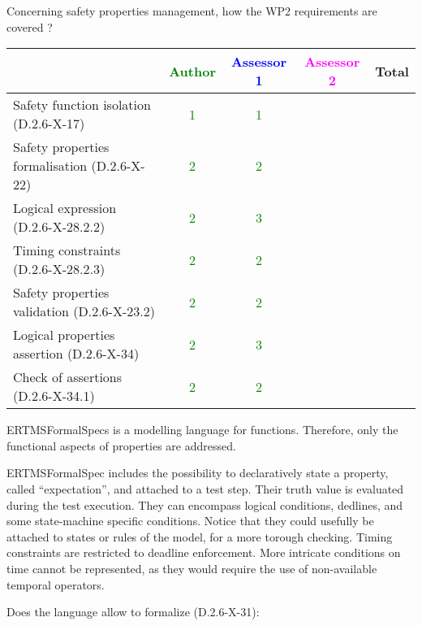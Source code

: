 Concerning safety properties management, how the WP2 requirements are covered ?

\begin{tabular}{|l | c | c | c | c|}
\hline
& \textcolor{green}{Author} & \textcolor{blue}{Assessor 1} & \textcolor{magenta}{Assessor 2} & Total \\
\hline 
Safety function isolation (D.2.6-X-17)  & \textcolor{green}{1} & \textcolor{green}{1} & &  \\
\hline 
Safety properties formalisation (D.2.6-X-22)  & \textcolor{green}{2} & \textcolor{green}{2} & &  \\
\hline
Logical expression (D.2.6-X-28.2.2)  & \textcolor{green}{2} & \textcolor{green}{3} & &  \\
\hline
Timing constraints (D.2.6-X-28.2.3)  & \textcolor{green}{2} & \textcolor{green}{2} & &  \\
\hline
Safety properties validation (D.2.6-X-23.2)  & \textcolor{green}{2} & \textcolor{green}{2} & &  \\
\hline
Logical properties assertion (D.2.6-X-34)  & \textcolor{green}{2} & \textcolor{green}{3} & &  \\
\hline
Check  of assertions (D.2.6-X-34.1)  & \textcolor{green}{2} & \textcolor{green}{2} & &  \\
\hline
\end{tabular}

\begin{author_comment}
ERTMSFormalSpecs is a modelling language for functions. Therefore, only the functional aspects of properties are addressed.  
\end{author_comment}

\begin{assessor1}
ERTMSFormalSpec includes the possibility to declaratively state a property, called "`expectation"', and attached to a test step. Their truth value is evaluated during the test execution. They can encompass logical conditions, dedlines, and some state-machine specific conditions. Notice that they could usefully be attached to states or rules of the model, for a more torough checking. 
Timing constraints are restricted to deadline enforcement. More intricate conditions on time cannot be represented, as they would require the use of non-available temporal operators. 
\end{assessor1}

Does the language allow to  formalize (D.2.6-X-31):


